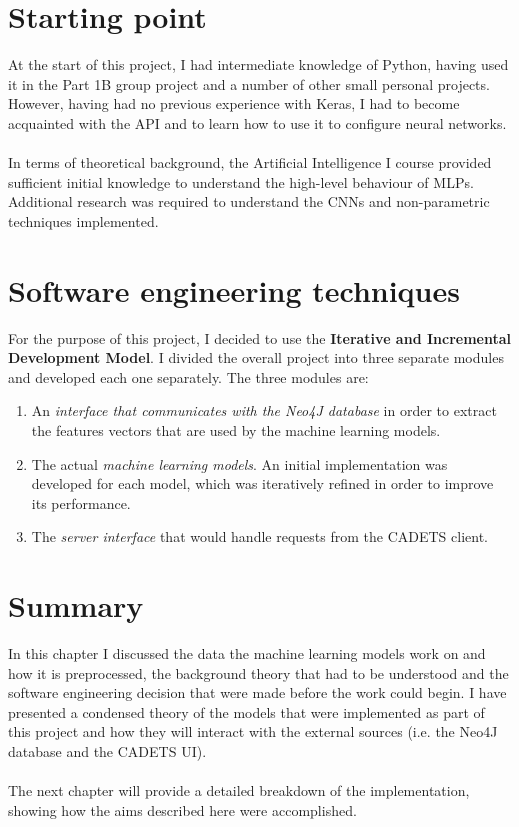 	\section{Starting point} \label{Section 2.6}
	At the start of this project, I had intermediate knowledge of Python, having used it in the Part 1B group project and a number of other small personal projects. However, having had no previous experience with Keras, I had to become acquainted with the API and to learn how to use it to configure neural networks.   
	\\ \\
	In terms of theoretical background, the Artificial Intelligence I course provided sufficient initial knowledge to understand the high-level behaviour of MLPs. Additional research was required to understand the CNNs and non-parametric techniques implemented.
	
	\section{Software engineering techniques} \label{Section 2.7}
	For the purpose of this project, I decided to use the \textbf{Iterative and Incremental Development Model}. I divided the overall project into three separate modules and developed each one separately. The three modules are:
	\begin{enumerate}
		\item An \textit{interface that communicates with the Neo4J database} in order to extract the features vectors that are used by the machine learning models.
		\item The actual \textit{machine learning models}. 	An initial implementation was developed for each model, which was iteratively refined in order to improve its performance.  
		\item The \textit{server interface} that would handle requests from the CADETS client.
	\end{enumerate}

	\section{Summary} \label{Section 2.8}
	In this chapter I discussed the data the machine learning models work on and how it is preprocessed, the background theory that had to be understood and the software engineering decision that were made before the work could begin. I have presented a condensed theory of the models that were implemented as part of this project and how they will interact with the external sources (i.e. the Neo4J database and the CADETS UI).
	\\ \\
	The next chapter will provide a detailed breakdown of the implementation, showing how the aims described here were accomplished. 
	
